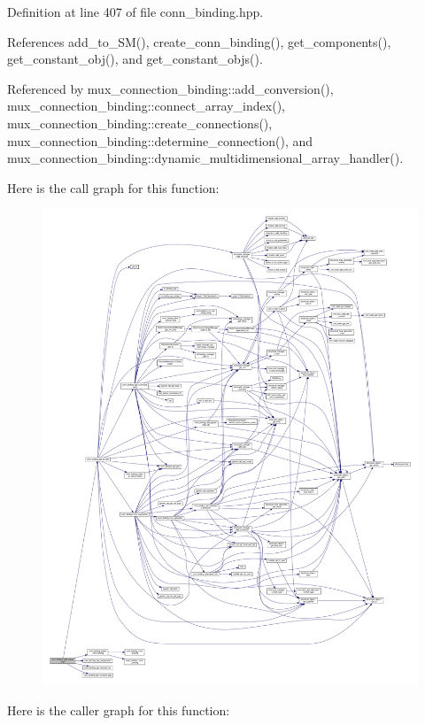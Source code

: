 Definition at line 407 of file conn\+\_\+binding.\+hpp.



References add\+\_\+to\+\_\+\+S\+M(), create\+\_\+conn\+\_\+binding(), get\+\_\+components(), get\+\_\+constant\+\_\+obj(), and get\+\_\+constant\+\_\+objs().



Referenced by mux\+\_\+connection\+\_\+binding\+::add\+\_\+conversion(), mux\+\_\+connection\+\_\+binding\+::connect\+\_\+array\+\_\+index(), mux\+\_\+connection\+\_\+binding\+::create\+\_\+connections(), mux\+\_\+connection\+\_\+binding\+::determine\+\_\+connection(), and mux\+\_\+connection\+\_\+binding\+::dynamic\+\_\+multidimensional\+\_\+array\+\_\+handler().

Here is the call graph for this function\+:
\nopagebreak
\begin{figure}[H]
\begin{center}
\leavevmode
\includegraphics[width=350pt]{d2/db1/classconn__binding_ab42e47f8c1b558caf9029baed9c59705_cgraph}
\end{center}
\end{figure}
Here is the caller graph for this function\+:
